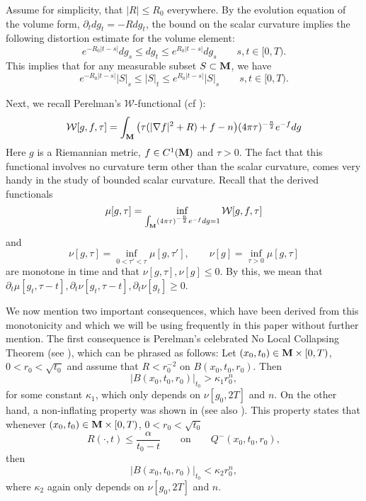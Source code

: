 \documentclass[11pt]{amsart}
\numberwithin{equation}{section}
\def\M{{\bf M}}
\numberwithin{equation}{section}
\begin{document}
Assume for simplicity, that $|R| \leq R_0$ everywhere.
By the evolution equation of the volume form, $\partial_t dg_t = - R dg_t$, the bound on the scalar curvature implies the following distortion estimate for the volume element:
\begin{equation} \label{eq:Prel-volelementdistortion}
 e^{- R_0 |t-s|} dg_s \leq dg_t \leq e^{R_0 |t-s|} dg_s \qquad s, t \in [0,T).
\end{equation}
This implies that for any measurable subset $S \subset \M$, we have
\begin{equation} \label{eq:Prel-voldistortion}
 e^{- R_0 |t-s|} |S|_s \leq |S|_t \leq e^{R_0 |t-s|} |S|_s \qquad s, t \in [0,T).
\end{equation}

Next, we recall Perelman's $\mathcal{W}$-functional (cf \cite{P:1}):
\[ \mathcal{W} [ g, f, \tau ] = \int_{\M} \big( \tau ( |\nabla f|^2 + R) + f - n \big) (4 \pi \tau)^{-\frac{n}2} e^{-f} dg \]
Here $g$ is a Riemannian metric, $f \in C^1(\M)$ and $\tau > 0$.
The fact that this functional involves no curvature term other than the scalar curvature, comes very handy in the study of bounded scalar curvature.
Recall that the derived functionals
\[ \mu [g, \tau] = \inf_{\int_{\M} (4 \pi \tau)^{-\frac{n}2} e^{-f} dg = 1} \mathcal{W} [ g, f, \tau ] \]
and
\[ \nu [g, \tau] = \inf_{0 < \tau' < \tau} \mu [g, \tau'], \qquad \nu[g] = \inf_{\tau > 0} \mu [g, \tau] \]
are monotone in time and that $\nu [g, \tau], \nu[g] \leq 0$.
By this, we mean that $\partial_t \mu [g_t, \tau - t], \partial_t \nu [g_t, \tau - t], \partial_t \nu[g_t] \geq 0$.

We now mention two important consequences, which have been derived from this monotonicity and which we will be using frequently in this paper without further mention.
The first consequence is Perelman's celebrated No Local Collapsing Theorem (see \cite{P:1}), which can be phrased as follows:
Let $(x_0,t_0) \in \M \times [0,T)$, $0 < r_0 < \sqrt{t_0}$ and assume that $R < r_0^{-2}$ on $B(x_0, t_0, r_0)$.
Then
\begin{equation} \label{eq:kappa1}
  |B(x_0,t_0,r_0)|_{t_0} > \kappa_1 r_0^n,
\end{equation}
for some constant $\kappa_1$, which only depends on $\nu[g_0, 2T]$ and $n$.
On the other hand, a non-inflating property was shown in \cite{Z11:1} (see also \cite{CW:2}).
This property states that whenever $(x_0,t_0) \in \M \times [0,T)$, $0 < r_0 < \sqrt{t_0}$
\[ R (\cdot, t) \leq \frac{\alpha}{t_0 - t} \qquad \text{on} \qquad Q^- (x_0, t_0, r_0), \]
then
\begin{equation} \label{eq:kappa2}
 | B(x_0,t_0,r_0) |_{t_0} < \kappa_2 r_0^n,
\end{equation}
where $\kappa_2$ again only depends on $\nu[g_0, 2T]$ and $n$.
\end{document}
